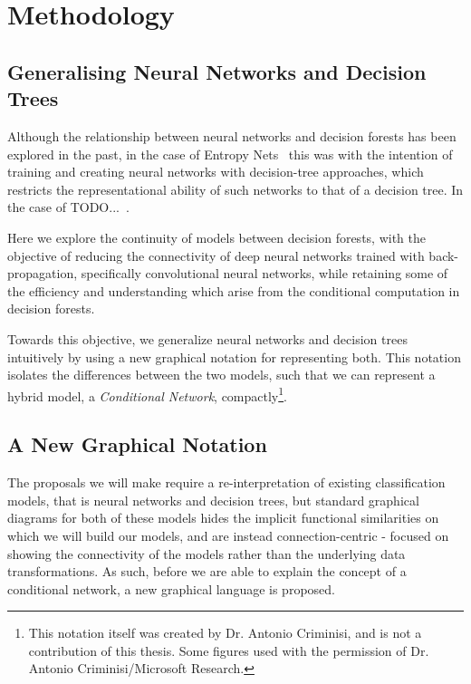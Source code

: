 \documentclass[thesis]{subfiles}
\begin{document}
\chapter{Methodology}
\label{methodology}
\ifpdf
    \graphicspath{{Figs/Raster/}{Figs/PDF/}{Figs/}}
\else
    \graphicspath{{Figs/Vector/}{Figs/}}
\fi

\section{Generalising Neural Networks and Decision Trees}
Although the relationship between neural networks and decision forests has been explored in the past, in the case of Entropy Nets~\cite{Sethi1990} this was with the intention of training and creating neural networks with decision-tree approaches, which restricts the representational ability of such networks to that of a decision tree. In the case of TODO...~\cite{Welbl2014casting}.

Here we explore the continuity of models between decision forests, with the objective of reducing the connectivity of deep neural networks trained with back-propagation, specifically convolutional neural networks, while retaining some of the efficiency and understanding which arise from the conditional computation in decision forests.

Towards this objective, we generalize neural networks and decision trees intuitively by using a new graphical notation for representing both. This notation isolates the differences between the two models, such that we can represent a hybrid model, \ie a \emph{Conditional Network}, compactly\footnote{This notation itself was created by Dr. Antonio Criminisi, and is not a contribution of this thesis. Some figures used with the permission of Dr. Antonio Criminisi/Microsoft Research.}.

\section{A New Graphical Notation}
The proposals we will make require a re-interpretation of existing classification models, that is neural networks and decision trees, but standard graphical diagrams for both of these models hides the implicit functional similarities on which we will build our models, and are instead connection-centric - focused on showing the connectivity of the models rather than the underlying data transformations. As such, before we are able to explain the concept of a conditional network, a new graphical language is proposed.
\end{document}
